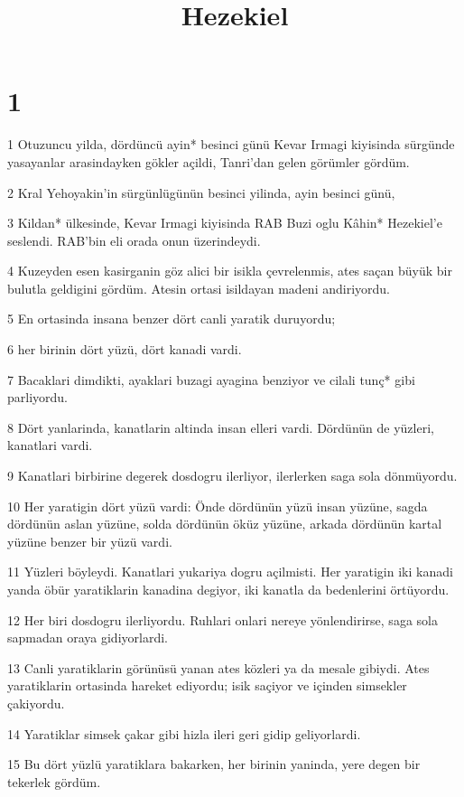 

\title{Hezekiel}


\chapter{1}

\par 1 Otuzuncu yilda, dördüncü ayin* besinci günü Kevar Irmagi kiyisinda sürgünde yasayanlar arasindayken gökler açildi, Tanri'dan gelen görümler gördüm.
\par 2 Kral Yehoyakin'in sürgünlügünün besinci yilinda, ayin besinci günü,
\par 3 Kildan* ülkesinde, Kevar Irmagi kiyisinda RAB Buzi oglu Kâhin* Hezekiel'e seslendi. RAB'bin eli orada onun üzerindeydi.
\par 4 Kuzeyden esen kasirganin göz alici bir isikla çevrelenmis, ates saçan büyük bir bulutla geldigini gördüm. Atesin ortasi isildayan madeni andiriyordu.
\par 5 En ortasinda insana benzer dört canli yaratik duruyordu;
\par 6 her birinin dört yüzü, dört kanadi vardi.
\par 7 Bacaklari dimdikti, ayaklari buzagi ayagina benziyor ve cilali tunç* gibi parliyordu.
\par 8 Dört yanlarinda, kanatlarin altinda insan elleri vardi. Dördünün de yüzleri, kanatlari vardi.
\par 9 Kanatlari birbirine degerek dosdogru ilerliyor, ilerlerken saga sola dönmüyordu.
\par 10 Her yaratigin dört yüzü vardi: Önde dördünün yüzü insan yüzüne, sagda dördünün aslan yüzüne, solda dördünün öküz yüzüne, arkada dördünün kartal yüzüne benzer bir yüzü vardi.
\par 11 Yüzleri böyleydi. Kanatlari yukariya dogru açilmisti. Her yaratigin iki kanadi yanda öbür yaratiklarin kanadina degiyor, iki kanatla da bedenlerini örtüyordu.
\par 12 Her biri dosdogru ilerliyordu. Ruhlari onlari nereye yönlendirirse, saga sola sapmadan oraya gidiyorlardi.
\par 13 Canli yaratiklarin görünüsü yanan ates közleri ya da mesale gibiydi. Ates yaratiklarin ortasinda hareket ediyordu; isik saçiyor ve içinden simsekler çakiyordu.
\par 14 Yaratiklar simsek çakar gibi hizla ileri geri gidip geliyorlardi.
\par 15 Bu dört yüzlü yaratiklara bakarken, her birinin yaninda, yere degen bir tekerlek gördüm.
